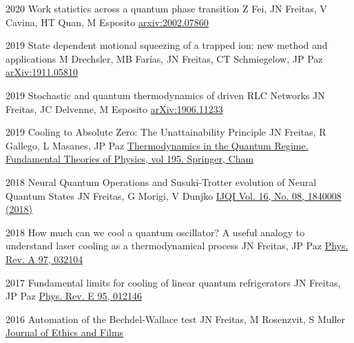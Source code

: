 

\begin{cvpubs}

\cvpub
    {2020}
    {Work statistics across a quantum phase transition}
    {Z Fei, JN Freitas, V Cavina, HT Quan, M Esposito}
    {\href{https://arxiv.org/pdf/2002.07860.pdf}{arxiv:2002.07860}}

\cvpub
    {2019}
    {State dependent motional squeezing of a trapped ion: new method and applications}
    {M Drechsler, MB Farías, JN Freitas, CT Schmiegelow, JP Paz}
    {\href{https://arxiv.org/abs/1911.05810}{arXiv:1911.05810}}

\cvpub
    {2019}
    {Stochastic and quantum thermodynamics of driven RLC Networks}
    {JN Freitas, JC Delvenne, M Esposito}
    {\href{https://arxiv.org/abs/1906.11233}{arXiv:1906.11233}}

\cvpub
    {2019}
    {Cooling to Absolute Zero: The Unattainability Principle}
    {JN Freitas, R Gallego, L Masanes,  JP Paz}
    {\href{https://link.springer.com/chapter/10.1007/978-3-319-99046-0_25}{Thermodynamics in the Quantum Regime. Fundamental Theories of Physics, vol 195. Springer, Cham}}

\cvpub
    {2018}
    {Neural Quantum Operations and Susuki-Trotter evolution of Neural Quantum States}
    {JN Freitas, G Morigi, V Dunjko}
    {\href{https://www.worldscientific.com/doi/abs/10.1142/S0219749918400087}{IJQI Vol. 16, No. 08, 1840008 (2018)}}

\cvpub
    {2018}
    {How much can we cool a quantum oscillator? A useful analogy to understand laser cooling as a thermodynamical process}
    {JN Freitas, JP Paz}
    {\href{https://journals.aps.org/pra/abstract/10.1103/PhysRevA.97.032104}{Phys. Rev. A 97, 032104}}

\cvpub
    {2017}
    {Fundamental limits for cooling of linear quantum refrigerators}
    {JN Freitas, JP Paz}
    {\href{http://journals.aps.org/pre/abstract/10.1103/PhysRevE.95.012146}{Phys. Rev. E 95, 012146}}

\cvpub
    {2016}
    {Automation of the Bechdel-Wallace test}
    {JN Freitas, M Rosenzvit, S Muller}
    {\href{http://www.journal.eticaycine.org/Automation-of-the-Bechdel-Wallace}{Journal of Ethics and Films}}


\end{cvpubs}
